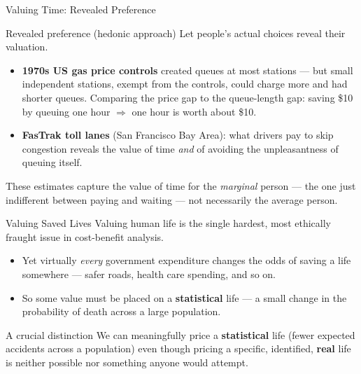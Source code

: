 \documentclass[11pt,aspectratio=169]{beamer}
\begin{document}
\begin{frame}{Valuing Time: Revealed Preference}
  \begin{block}{Revealed preference (hedonic approach)}
    Let people's actual choices reveal their valuation.
  \end{block}
  \begin{itemize}
    \item \textbf{1970s US gas price controls} created queues at most stations --- but small independent stations, exempt from the controls, could charge more and had shorter queues. Comparing the price gap to the queue-length gap: saving \$10 by queuing one hour $\Rightarrow$ one hour is worth about \$10.
    \item \textbf{FasTrak toll lanes} (San Francisco Bay Area): what drivers pay to skip congestion reveals the value of time \emph{and} of avoiding the unpleasantness of queuing itself.
  \end{itemize}
  \small These estimates capture the value of time for the \emph{marginal} person --- the one just indifferent between paying and waiting --- not necessarily the average person.
\end{frame}

\begin{frame}{Valuing Saved Lives}
  Valuing human life is the single hardest, most ethically fraught issue in cost-benefit analysis.
  \begin{itemize}
    \item Yet virtually \emph{every} government expenditure changes the odds of saving a life somewhere --- safer roads, health care spending, and so on.
    \item So some value must be placed on a \textbf{statistical} life --- a small change in the probability of death across a large population.
  \end{itemize}
  \begin{alertblock}{A crucial distinction}
    We can meaningfully price a \textbf{statistical} life (fewer expected accidents across a population) even though pricing a specific, identified, \textbf{real} life is neither possible nor something anyone would attempt.
  \end{alertblock}
\end{frame}
\end{document}
